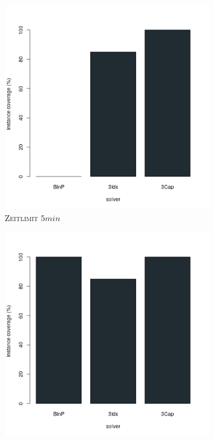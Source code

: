 \begin{figure}[H]
\centering

\begin{subfigure}[b]{0.3\textwidth}
\centering
\includegraphics[width=1.1\textwidth]{img/solver_instance_coverage_b=3_l_300s.png}
\caption{\textsc{Zeitlimit} $5min$}
\label{fig:instance_coverage_b=3_l_a}
\end{subfigure}
\hfill
\begin{subfigure}[b]{0.3\textwidth}
\centering
\includegraphics[width=1.1\textwidth]{img/solver_instance_coverage_b=3_l_900s.png}

\end{subfigure}
\end{figure}
